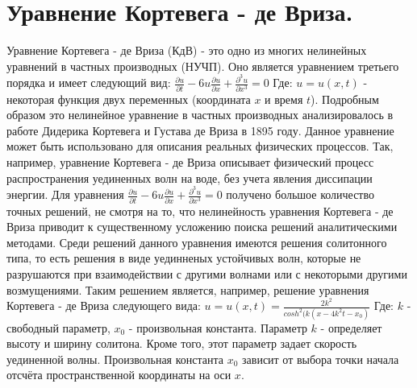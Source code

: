 \documentclass[14pt,a4paper]{article}
\begin{document}
\onehalfspacing
\section{Уравнение Кортевега - де Вриза.}
Уравнение Кортевега - де Вриза (КдВ) - это одно из многих нелинейных уравнений в частных производных (НУЧП). Оно является уравнением третьего порядка и имеет следующий вид: \newline
$\frac{\partial u}{\partial t} - 6u \frac{\partial u}{\partial x} + \frac{\partial^3 u}{\partial x^3} = 0$
\newline
Где:\newline
$u = u(x, t)$ - некоторая функция двух переменных (координата $x$ и время $t$). \newline
Подробным образом это нелинейное уравнение в частных производных анализировалось в работе  Дидерика Кортевега и Густава де Вриза в 1895 году.
\newline
Данное уравнение может быть использовано для описания реальных физических процессов. Так, например, уравнение Кортевега - де Вриза описывает физический процесс распространения уединенных волн на воде, без учета явления диссипации энергии.
\newline
Для уравнения $\frac{\partial u}{\partial t} - 6u \frac{\partial u}{\partial x} + \frac{\partial^3 u}{\partial x^3} = 0$ получено большое количество точных решений, не смотря на то, что нелинейность уравнения Кортевега - де Вриза приводит к существенному усложению поиска решений аналитическими методами.
\newline
Среди решений данного уравнения имеются решения солитонного типа, то есть решения в виде уединненых устойчивых волн, которые не разрушаются при взаимодействии с другими волнами или с некоторыми другими возмущениями. Таким решением является, например, решение уравнения Кортевега - де Вриза следующего вида: \newline
$u = u(x, t) = \frac{2k^2}{cosh^2 (k(x - 4k^2t - x_0)}$
\newline
Где:\newline
$k$ - свободный параметр, \newline
$x_0$ - произвольная константа. \newline
Параметр $k$ - определяет высоту и ширину солитона. Кроме того, этот параметр задает скорость уединенной волны. \newline
Произвольная константа $x_0$ зависит от выбора точки начала отсчёта пространственной координаты на оси $x$. \newline
\newline
\end{document}
